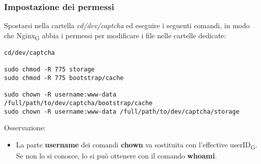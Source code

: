 \subsubsection{Impostazione dei permessi}
Spostarsi nella cartella \textit{cd/dev/captcha} ed eseguire i seguenti comandi, in modo che Nginx\textsubscript{G} abbia i permessi per modificare i file nelle cartelle dedicate:
\begin{verbatim}
cd/dev/captcha

sudo chmod -R 775 storage
sudo chmod -R 775 bootstrap/cache

sudo chown -R username:www-data /full/path/to/dev/captcha/bootstrap/cache 
sudo chown -R username:www-data /full/path/to/dev/captcha/storage
\end{verbatim}
Osservazione:
\begin{itemize}
	\item La parte \textbf{username} dei comandi \textbf{chown} va sostituita con l'effective userID\textsubscript{G}. Se non lo si conosce, lo si può ottenere con il comando \textbf{whoami}. 
\end{itemize} 


